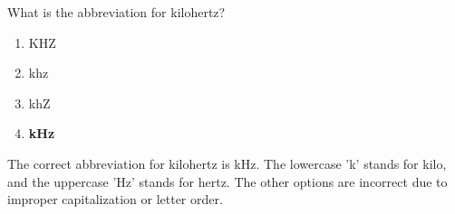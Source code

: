 \begin{tcolorbox}[colback=gray!10!white,colframe=black!75!black,title={T5C13}]
    What is the abbreviation for kilohertz?
    \begin{enumerate}[label=\Alph*),noitemsep]
        \item KHZ
        \item khz
        \item khZ
        \item \textbf{kHz}
    \end{enumerate}
\end{tcolorbox}
The correct abbreviation for kilohertz is kHz. The lowercase 'k' stands for kilo, and the uppercase 'Hz' stands for hertz. The other options are incorrect due to improper capitalization or letter order.
